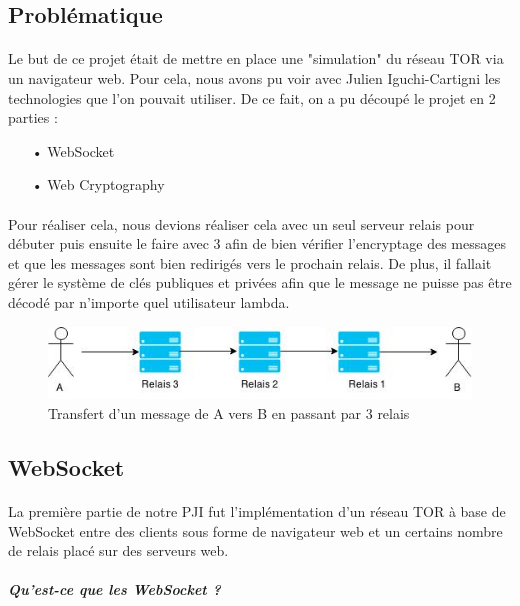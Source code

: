 \documentclass[a4paper,12pt]{report}
\begin{document}
	\subsection{Problématique}
	\paragraph*{}
	Le but de ce projet était de mettre en place une "simulation" du réseau TOR via un navigateur web. Pour cela, nous avons pu voir avec Julien Iguchi-Cartigni les technologies que l'on pouvait utiliser. De ce fait, on a pu découpé le projet en 2 parties : 
	\\
	\begin{itemize}
		\item[•] WebSocket
		\item[•] Web Cryptography
	\end{itemize}
	\paragraph*{}
	Pour réaliser cela, nous devions réaliser cela avec un seul serveur relais pour débuter puis ensuite le faire avec 3 afin de bien vérifier l'encryptage des messages et que les messages sont bien redirigés vers le prochain relais. De plus, il fallait gérer le système de clés publiques et privées afin que le message ne puisse pas être décodé par n'importe quel utilisateur lambda.
	\begin{figure}[h] %
		\includegraphics[scale=0.8]{project.jpg}
		\caption{Transfert d'un message de A vers B en passant par 3 relais}
		\label{project}
	\end{figure}
	
	\subsection{WebSocket}
	\paragraph*{}
	La première partie de notre PJI fut l'implémentation d'un réseau TOR à base de WebSocket entre des clients sous forme de navigateur web et un certains nombre de relais placé sur des serveurs web.
	\\\\
	\textit{\textbf{Qu'est-ce que les WebSocket ?}}
\end{document}
